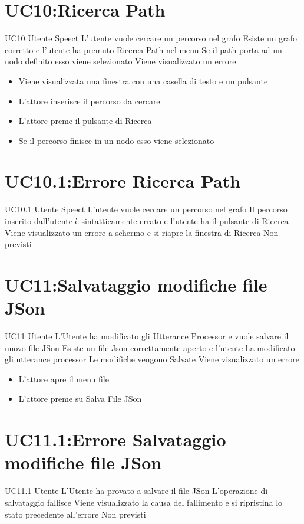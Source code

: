 \documentclass[../AnalisideiRequisiti.tex]{subfiles}
\begin{document}
\section{UC10:Ricerca Path}
\UserCase
{UC10}
{Utente}
{Speect}
{L'utente vuole cercare un percorso nel grafo}
{Esiste un grafo corretto e l'utente ha premuto Ricerca Path nel menu}
{Se il path porta ad un nodo definito esso viene selezionato }
{Viene visualizzato un errore }
{
	\begin{itemize}
		\item{} Viene visualizzata una finestra con una casella di testo e un pulsante
		\item{} L'attore inserisce il percorso da cercare
		\item{} L'attore preme il pulsante di Ricerca
		\item{} Se il percorso finisce in un nodo esso viene selezionato 
 	\end{itemize}
}

\section{UC10.1:Errore Ricerca Path}
\UserCase
{UC10.1}
{Utente}
{Speect}
{L'utente vuole cercare un percorso nel grafo}
{Il percorso inserito dall'utente è sintatticamente errato e l'utente ha il pulsante di Ricerca}
{Viene visualizzato un errore a schermo e si riapre la finestra di Ricerca }
{Non previsti}
{}

\section{UC11:Salvataggio modifiche file JSon}
\UserCase
{UC11}
{Utente}
{}
{L'Utente ha modificato gli Utterance Processor e vuole salvare il nuovo file JSon}
{Esiste un file Json correttamente aperto  e l'utente ha modificato gli utterance processor }
{Le modifiche vengono Salvate}
{Viene visualizzato un errore }
{\begin{itemize}
		\item{} L'attore apre il menu file 
		\item{} L'attore preme su Salva File JSon
\end{itemize}
}
\section{UC11.1:Errore Salvataggio modifiche file JSon}
\UserCase
{UC11.1}
{Utente}
{}
{L'Utente ha provato a salvare il file JSon}
{L'operazione di salvataggio fallisce }
{Viene visualizzato la causa del fallimento e si ripristina lo stato precedente all'errore}
{Non previsti}
{}
\end{document}
